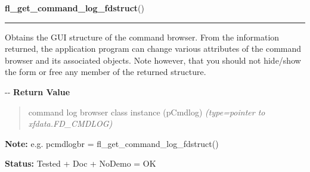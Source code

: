 \hspace{.8\funcindent}\begin{boxedminipage}{\funcwidth}

    \raggedright \textbf{fl\_get\_command\_log\_fdstruct}()

    \vspace{-1.5ex}

    \rule{\textwidth}{0.5\fboxrule}
\setlength{\parskip}{2ex}

Obtains the GUI structure of the command browser. From the information
returned, the application program can change various attributes of the
command browser and its associated objects. Note however, that you should
not hide/show the form or free any member of the returned structure.

-{}-
\setlength{\parskip}{1ex}
      \textbf{Return Value}
    \vspace{-1ex}

      \begin{quote}

command log browser class instance (pCmdlog)
      {\it (type=pointer to xfdata.FD\_CMDLOG)}

      \end{quote}

\textbf{Note:} 
e.g. pcmdlogbr = fl\_get\_command\_log\_fdstruct()


\textbf{Status:} 
Tested + Doc + NoDemo = OK


    \end{boxedminipage}

    \label{xformslib:flgoodies:fl_use_fselector}

    \vspace{0.5ex}

